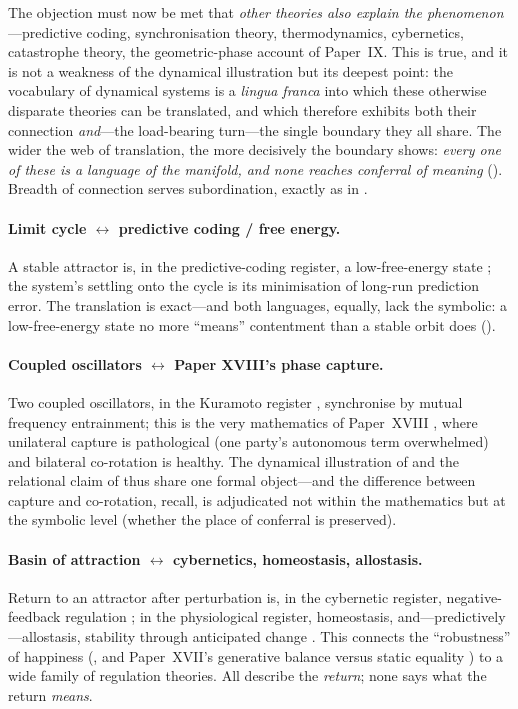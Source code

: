 The objection must now be met that \emph{other theories also explain the phenomenon}---predictive coding, synchronisation theory, thermodynamics, cybernetics, catastrophe theory, the geometric-phase account of Paper~IX. This is true, and it is not a weakness of the dynamical illustration but its deepest point: the vocabulary of dynamical systems is a \emph{lingua franca} into which these otherwise disparate theories can be translated, and which therefore exhibits both their connection \emph{and}---the load-bearing turn---the single boundary they all share. The wider the web of translation, the more decisively the boundary shows: \emph{every one of these is a language of the manifold, and none reaches conferral of meaning} (). Breadth of connection serves subordination, exactly as in .

\paragraph{Limit cycle $\leftrightarrow$ predictive coding / free energy.} A stable attractor is, in the predictive-coding register, a low-free-energy state \parencite{friston2010}; the system's settling onto the cycle is its minimisation of long-run prediction error. The translation is exact---and both languages, equally, lack the symbolic: a low-free-energy state no more ``means'' contentment than a stable orbit does ().

\paragraph{Coupled oscillators $\leftrightarrow$ Paper XVIII's phase capture.} Two coupled oscillators, in the Kuramoto register \parencite{kuramoto1984,strogatz2001}, synchronise by mutual frequency entrainment; this is the very mathematics of Paper~XVIII \parencite{paperxvii}, where unilateral capture is pathological (one party's autonomous term overwhelmed) and bilateral co-rotation is healthy. The dynamical illustration of  and the relational claim of  thus share one formal object---and the difference between capture and co-rotation, recall, is adjudicated not within the mathematics but at the symbolic level (whether the place of conferral is preserved).

\paragraph{Basin of attraction $\leftrightarrow$ cybernetics, homeostasis, allostasis.} Return to an attractor after perturbation is, in the cybernetic register, negative-feedback regulation \parencite{wiener1948}; in the physiological register, homeostasis, and---predictively---allostasis, stability through anticipated change \parencite{sterling2012}. This connects the ``robustness'' of happiness (, and Paper~XVII's generative balance versus static equality \parencite{paperxvii}) to a wide family of regulation theories. All describe the \emph{return}; none says what the return \emph{means}.

